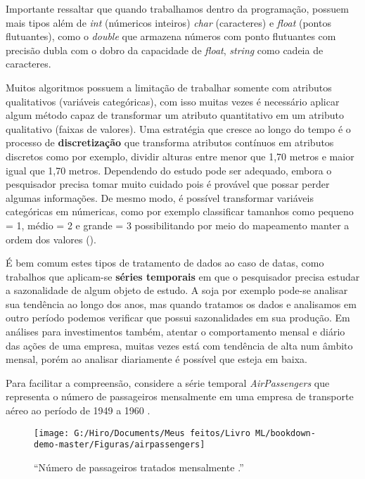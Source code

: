 \documentclass[
]{book}
\begin{document}
Importante ressaltar que quando trabalhamos dentro da programação, possuem mais tipos além de \emph{int} (númericos inteiros) \emph{char} (caracteres) e \emph{float} (pontos flutuantes), como o \emph{double} que armazena números com ponto flutuantes com precisão dubla com o dobro da capacidade de \emph{float}, \emph{string} como cadeia de caracteres.

Muitos algoritmos possuem a limitação de trabalhar somente com atributos qualitativos (variáveis categóricas), com isso muitas vezes é necessário aplicar algum método capaz de transformar um atributo quantitativo em um atributo qualitativo (faixas de valores). Uma estratégia que cresce ao longo do tempo é o processo de \textbf{discretização} que transforma atributos contínuos em atributos discretos como por exemplo, dividir alturas entre menor que 1,70 metros e maior igual que 1,70 metros. Dependendo do estudo pode ser adequado, embora o pesquisador precisa tomar muito cuidado pois é provável que possar perder algumas informações. De mesmo modo, é possível transformar variáveis categóricas em númericas, como por exemplo classificar tamanhos como pequeno = 1, médio = 2 e grande = 3 possibilitando por meio do mapeamento manter a ordem dos valores (\citet{batista2003pre}).

É bem comum estes tipos de tratamento de dados ao caso de datas, como trabalhos que aplicam-se \textbf{séries temporais} em que o pesquisador precisa estudar a sazonalidade de algum objeto de estudo. A soja por exemplo pode-se analisar sua tendência ao longo dos anos, mas quando tratamos os dados e analisamos em outro período podemos verificar que possui sazonalidades em sua produção. Em análises para investimentos também, atentar o comportamento mensal e diário das ações de uma empresa, muitas vezes está com tendência de alta num âmbito mensal, porém ao analisar diariamente é possível que esteja em baixa.

Para facilitar a compreensão, considere a série temporal \emph{AirPassengers} que representa o número de passageiros mensalmente em uma empresa de transporte aéreo ao período de 1949 a 1960 \citep{box1976time}.

\begin{figure}

{\centering \texttt{[image: G:/Hiro/Documents/Meus feitos/Livro ML/bookdown-demo-master/Figuras/airpassengers]} 

}

\caption{``Número de passageiros tratados mensalmente \citep{box1976time}.''}\label{fig:airpassengers}
\end{figure}
\end{document}
